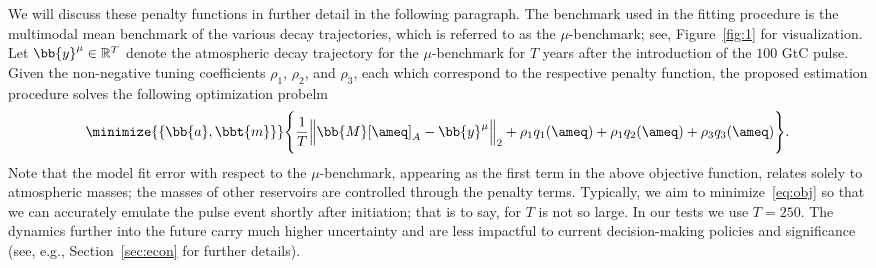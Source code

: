 
\newpage







\newpage
We will discuss these penalty functions in further detail in the following paragraph.
%
The benchmark used in the fitting procedure is the multimodal mean benchmark of the various decay trajectories, which is referred to as the $\mu$-benchmark; see, Figure~\ref{fig:1} for visualization.
%
Let $\bb{y}^{\mu} \in \mathbb{R}^{T}$ denote the atmospheric decay trajectory for the $\mu$-benchmark for $T$ years after the introduction of the $100$ GtC pulse.
%
 Given the non-negative tuning coefficients $\rho_1$, $\rho_2$, and $\rho_3$, each which correspond to the respective penalty function, the proposed estimation procedure solves the following optimization probelm
 \begin{align}\label{eq:obj}
 	\minimize{\{ \bb{a} , \bbt{m} \}}  \Bigg\{  
 	      \frac{1}{T} \Big \| \bb{M}[\ameq]_A - \bb{y}^\mu \Big \|_2+
 	 	 \rho_1 q_1(\ameq) +  
 		 \rho_1 q_2(\ameq) +   
 		 \rho_3 q_3(\ameq)  
 		 \Bigg\}.
 \end{align}
%
Note that the model fit error with respect to the $\mu$-benchmark, appearing as the first term in the above objective function, relates solely to atmospheric masses; the masses of other reservoirs are controlled through the penalty terms.
%
Typically, we aim to minimize~\eqref{eq:obj} so that we can accurately emulate the pulse event shortly after initiation; that is to say, for $T$ is not so large. 
%
In our tests we use $T=250$.
%
The dynamics further into the future carry much higher uncertainty and are less impactful to current decision-making policies and significance (see, e.g., Section~\ref{sec:econ} for further details).
%

